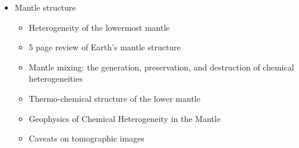 \begin{itemize}
\item Mantle structure
   \begin{itemize}
   \item [\twothousand] Heterogeneity of the lowermost mantle \cite{garn00}
   \item [\twothousandone] 5 page review of Earth's mantle structure \cite{hewo01}
   \item [\twothousandtwo] Mantle mixing: the generation, preservation, and destruction of chemical heterogeneities \cite{vahb02}
   \item [\twothousandseven] Thermo-chemical structure of the lower mantle \cite{dett07}
   \item [\twothousandtwelve] Geophysics of Chemical Heterogeneity in the Mantle \cite{stli12}
   \item [\twothousandthirteen] Caveats on tomographic images \cite{fopa13}
   \end{itemize}


\end{itemize}
